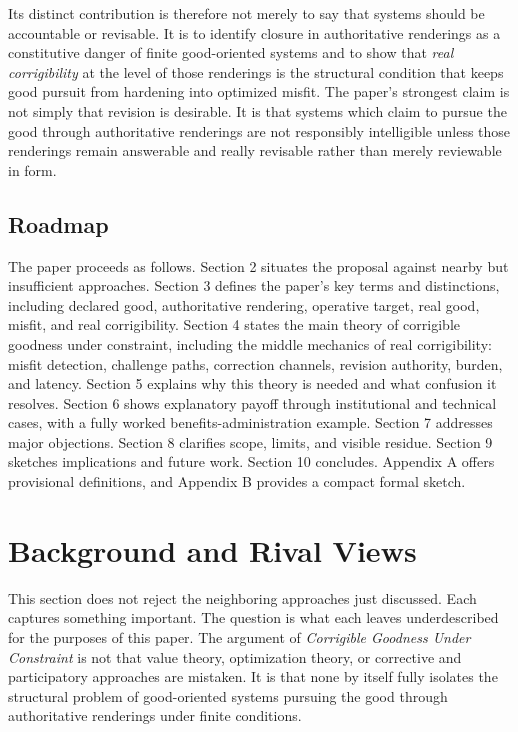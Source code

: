 \documentclass[11pt]{article}
\renewcommand{\emph}[1]{\textit{#1}}
\begin{document}
Its distinct contribution is therefore not merely to say that systems should be accountable or revisable. It is to identify closure in authoritative renderings as a constitutive danger of finite good-oriented systems and to show that \emph{real corrigibility} at the level of those renderings is the structural condition that keeps good pursuit from hardening into optimized misfit. The paper's strongest claim is not simply that revision is desirable. It is that systems which claim to pursue the good through authoritative renderings are not responsibly intelligible unless those renderings remain answerable and really revisable rather than merely reviewable in form.

\subsection{Roadmap}

The paper proceeds as follows. Section 2 situates the proposal against nearby but insufficient approaches. Section 3 defines the paper's key terms and distinctions, including declared good, authoritative rendering, operative target, real good, misfit, and real corrigibility. Section 4 states the main theory of corrigible goodness under constraint, including the middle mechanics of real corrigibility: misfit detection, challenge paths, correction channels, revision authority, burden, and latency. Section 5 explains why this theory is needed and what confusion it resolves. Section 6 shows explanatory payoff through institutional and technical cases, with a fully worked benefits-administration example. Section 7 addresses major objections. Section 8 clarifies scope, limits, and visible residue. Section 9 sketches implications and future work. Section 10 concludes. Appendix A offers provisional definitions, and Appendix B provides a compact formal sketch.
\section{Background and Rival Views}

This section does not reject the neighboring approaches just discussed. Each captures something important. The question is what each leaves underdescribed for the purposes of this paper. The argument of \emph{Corrigible Goodness Under Constraint} is not that value theory, optimization theory, or corrective and participatory approaches are mistaken. It is that none by itself fully isolates the structural problem of good-oriented systems pursuing the good through authoritative renderings under finite conditions.
\end{document}

